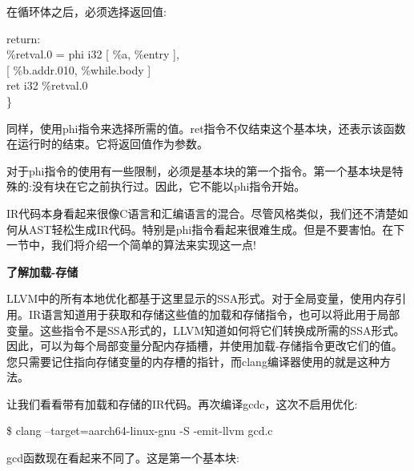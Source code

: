 在循环体之后，必须选择返回值:\par

\begin{tcolorbox}[colback=white,colframe=black]
return: \\
\hspace*{0.5cm}\%retval.0 = phi i32 [ \%a, \%entry ], \\
\hspace*{3.5cm}[ \%b.addr.010, \%while.body ] \\
\hspace*{0.5cm}ret i32 \%retval.0 \\
\}
\end{tcolorbox}

同样，使用phi指令来选择所需的值。ret指令不仅结束这个基本块，还表示该函数在运行时的结束。它将返回值作为参数。\par

对于phi指令的使用有一些限制，必须是基本块的第一个指令。第一个基本块是特殊的:没有块在它之前执行过。因此，它不能以phi指令开始。\par

IR代码本身看起来很像C语言和汇编语言的混合。尽管风格类似，我们还不清楚如何从AST轻松生成IR代码。特别是phi指令看起来很难生成。但是不要害怕。在下一节中，我们将介绍一个简单的算法来实现这一点!\par

\hspace*{\fill} \par %
\textbf{了解加载-存储}

LLVM中的所有本地优化都基于这里显示的SSA形式。对于全局变量，使用内存引用。IR语言知道用于获取和存储这些值的加载和存储指令，也可以将此用于局部变量。这些指令不是SSA形式的，LLVM知道如何将它们转换成所需的SSA形式。因此，可以为每个局部变量分配内存插槽，并使用加载-存储指令更改它们的值。您只需要记住指向存储变量的内存槽的指针，而clang编译器使用的就是这种方法。\par

让我们看看带有加载和存储的IR代码。再次编译gcdc，这次不启用优化:\par

\begin{tcolorbox}[colback=white,colframe=black]
\$ clang --target=aarch64-linux-gnu -S -emit-llvm gcd.c
\end{tcolorbox}

gcd函数现在看起来不同了。这是第一个基本块:\par

